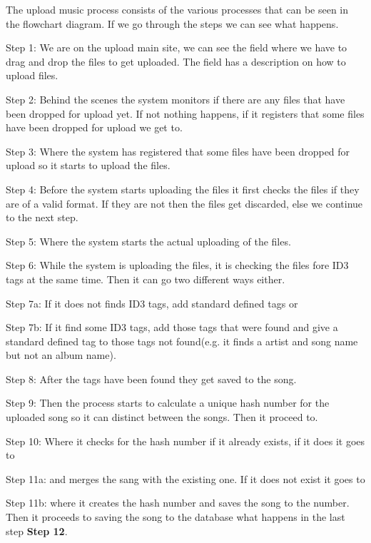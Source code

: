 The upload music process consists of the various processes that can be seen in the flowchart diagram. If we go through the steps we can see what happens.
\begin{description}
\item{Step 1:} We are on the upload main site, we can see the field where we have to drag and drop the files to get uploaded. The field has a description on how to upload files.
\item{Step 2:} Behind the scenes the system monitors if there are any files that have been dropped for upload yet. If not nothing happens, if it registers that some files have been dropped for upload we get to.
\item{Step 3:} Where the system has registered that some files have been dropped for upload so it starts to upload the files.
\item{Step 4:} Before the system starts uploading the files it first checks the files if they are of a valid format. If they are not then the files get discarded, else we continue to the next step.
\item{Step 5:} Where the system starts the actual uploading of the files.
\item{Step 6:} While the system is uploading the files, it is checking the files fore ID3 tags at the same time. Then it can go two different ways either.
\item{Step 7a:} If it does not finds ID3 tags, add standard defined tags or
\item{Step 7b:} If it find some ID3 tags, add those tags that were found and give a standard defined tag to those tags not found(e.g. it finds a artist and song name but not an album name).
\item{Step 8:} After the tags have been found they get saved to the song.
\item{Step 9:} Then the process starts to calculate a unique hash number for the uploaded song so it can distinct between the songs. Then it proceed to.
\item{Step 10:} Where it checks for the hash number if it already exists, if it does it goes to
\item{Step 11a:} and merges the sang with the existing one. If it does not exist it goes to
\item{Step 11b:} where it creates the hash number and saves the song to the number. Then it proceeds to saving the song to the database what happens in the last step \textbf{Step 12}.
\end{description}